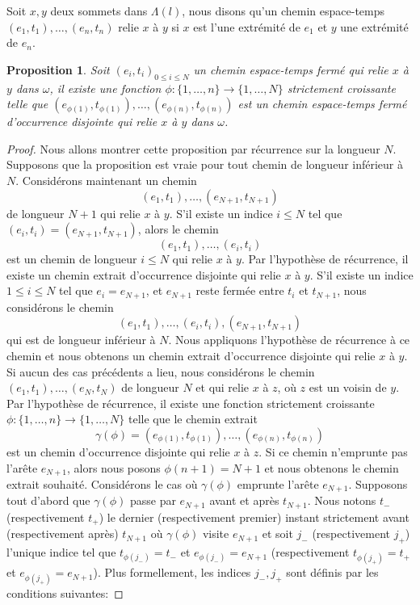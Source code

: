 \documentclass[titlepage,a4paper,12pt]{article}
\newcounter{d}
\newcounter{t}
\newcounter{p}
\newcounter{c}
\newcounter{a}
\newcounter{l}
\newtheorem{prop}[p]{Proposition}
\begin{document}
Soit $x,y$ deux sommets dans $\Lambda(l)$, nous disons qu'un chemin espace-temps $(e_1,t_1),\dots,(e_n,t_n)$ relie $x$ à $y$ si $x$ est l'une extrémité de $e_1$ et $y$ une extrémité de $e_n$.
\begin{prop}
Soit $(e_i,t_i)_{0\leqslant i \leqslant N}$ un chemin espace-temps fermé qui relie $x$ à $y$ dans $\omega$, il existe une fonction $\phi: \{1,\dots, n\}\rightarrow \{1,\dots, N\}$ strictement croissante telle que $(e_{\phi(1)},t_{\phi(1)}),\dots,(e_{\phi(n)},t_{\phi(n)})$ est un chemin espace-temps fermé d'occurrence disjointe qui relie $x$ à $y$ dans $\omega$.
\end{prop}
\begin{proof}
Nous allons montrer cette proposition par récurrence sur la longueur $N$. Supposons que la proposition est vraie pour tout chemin de longueur inférieur à $N$. Considérons maintenant un chemin $$(e_1,t_1),\dots, (e_{N+1},t_{N+1})$$ de longueur $N+1$ qui relie $x$ à $y$. S'il existe un indice $i\leqslant N$ tel que $(e_i,t_i) = (e_{N+1},t_{N+1})$, alors le chemin $$(e_1,t_1),\dots,(e_i,t_i)
$$ est un chemin de longueur $i\leqslant N$ qui relie $x$ à $y$. Par l'hypothèse de récurrence, il existe un chemin extrait d'occurrence disjointe qui relie $x$ à $y$. 
S'il existe un indice $1\leqslant i\leqslant N$ tel que $e_i = e_{N+1}$, et $e_{N+1}$ reste fermée entre $t_i$ et $t_{N+1}$, nous considérons le chemin $$(e_1,t_1), \dots, (e_{i},t_{i}), (e_{N+1},t_{N+1})$$ qui est de longueur inférieur à $N$. Nous appliquons l'hypothèse de récurrence à ce chemin et nous obtenons un chemin extrait d'occurrence disjointe qui relie $x$ à $y$. Si aucun des cas précédents a lieu, nous considérons le chemin $(e_1,t_1),\dots,(e_N,t_N)$ de longueur $N$ et qui relie $x$ à $z$, où $z$ est un voisin de $y$. Par l'hypothèse de récurrence, il existe une fonction strictement croissante $\phi:\{1,\dots,n\}\rightarrow \{1,\dots, N\}$ telle que le chemin extrait $$\gamma(\phi) = (e_{\phi(1)},t_{\phi(1)}),\dots,(e_{\phi(n)},t_{\phi(n)})$$ est un chemin d'occurrence disjointe qui relie $x$ à $z$. 
Si ce chemin n'emprunte pas l'arête $e_{N+1}$, alors nous posons $\phi(n+1) = N+1$ et nous obtenons le chemin extrait souhaité.
Considérons le cas où $\gamma(\phi)$ emprunte l'arête $e_{N+1}$. Supposons tout d'abord que $\gamma(\phi)$ passe par $e_{N+1}$ avant et après $t_{N+1}$. Nous notons $t_-$ (respectivement $t_+$) le dernier (respectivement premier) instant strictement avant (respectivement après) $t_{N+1}$ où $\gamma(\phi)$ visite $e_{N+1}$ et soit $j_-$ (respectivement $j_+$) l'unique indice tel que $t_{\phi(j_-)}= t_-$ et $e_{\phi(j_-)}= e_{N+1}$ (respectivement $t_{\phi(j_+)}= t_+$ et $e_{\phi(j_+)}= e_{N+1}$). Plus formellement, les indices $j_-,j_+$ sont définis par les conditions suivantes:

\end{proof}
\end{document}
